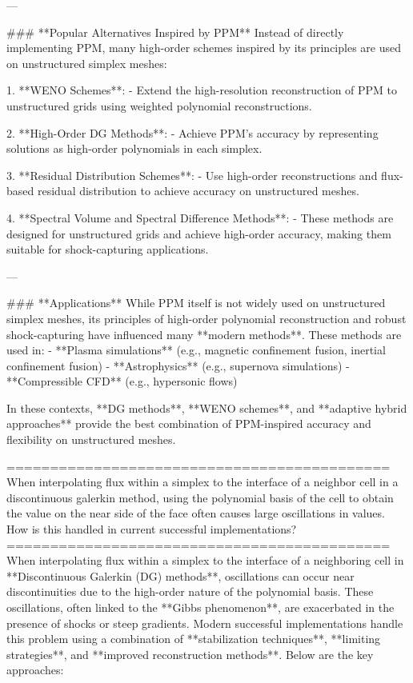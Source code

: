 ---

### **Popular Alternatives Inspired by PPM**
Instead of directly implementing PPM, many high-order schemes inspired by its principles are used on unstructured simplex meshes:

1. **WENO Schemes**:
   - Extend the high-resolution reconstruction of PPM to unstructured grids using weighted polynomial reconstructions.

2. **High-Order DG Methods**:
   - Achieve PPM's accuracy by representing solutions as high-order polynomials in each simplex.

3. **Residual Distribution Schemes**:
   - Use high-order reconstructions and flux-based residual distribution to achieve accuracy on unstructured meshes.

4. **Spectral Volume and Spectral Difference Methods**:
   - These methods are designed for unstructured grids and achieve high-order accuracy, making them suitable for shock-capturing applications.

---

### **Applications**
While PPM itself is not widely used on unstructured simplex meshes, its principles of high-order polynomial reconstruction and robust shock-capturing have influenced many **modern methods**. These methods are used in:
- **Plasma simulations** (e.g., magnetic confinement fusion, inertial confinement fusion)
- **Astrophysics** (e.g., supernova simulations)
- **Compressible CFD** (e.g., hypersonic flows)

In these contexts, **DG methods**, **WENO schemes**, and **adaptive hybrid approaches** provide the best combination of PPM-inspired accuracy and flexibility on unstructured meshes.

============================================
When interpolating flux within a simplex to the interface of a neighbor cell in a discontinuous galerkin method, using the polynomial basis of the cell to obtain the value on the near side of the face often causes large oscillations in values. How is this handled in current successful implementations?
============================================
When interpolating flux within a simplex to the interface of a neighboring cell in **Discontinuous Galerkin (DG) methods**, oscillations can occur near discontinuities due to the high-order nature of the polynomial basis. These oscillations, often linked to the **Gibbs phenomenon**, are exacerbated in the presence of shocks or steep gradients. Modern successful implementations handle this problem using a combination of **stabilization techniques**, **limiting strategies**, and **improved reconstruction methods**. Below are the key approaches:

